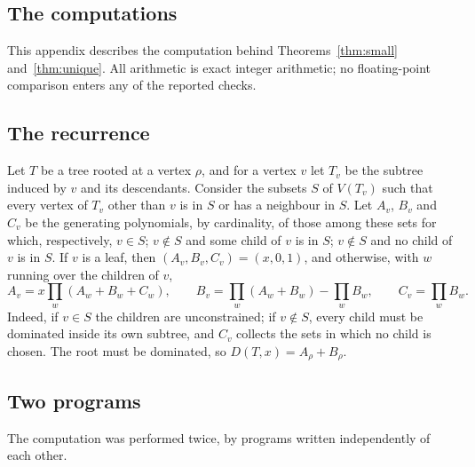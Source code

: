 \documentclass[smallextended,envcountsect,envcountsame]{svjour3}
\begin{document}
\begin{appendices}
\section{The computations}\label{app:computation}

This appendix describes the computation behind Theorems~\ref{thm:small}
and~\ref{thm:unique}. All
arithmetic is exact integer arithmetic; no floating-point comparison enters
any of the reported checks.

\subsection*{The recurrence}
Let $T$ be a tree rooted at a vertex $\rho$, and for a vertex $v$ let $T_v$
be the subtree induced by $v$ and its descendants. Consider the subsets $S$
of $V(T_v)$ such that every vertex of $T_v$ other than $v$ is in $S$ or has a
neighbour in $S$. Let $A_v$, $B_v$ and $C_v$ be the generating polynomials, by
cardinality, of those among these sets for which, respectively, $v\in S$;
$v\notin S$ and some child of $v$ is in $S$; $v\notin S$ and no child of $v$
is in $S$. If $v$ is a leaf, then $(A_v,B_v,C_v)=(x,0,1)$, and otherwise,
with $w$ running over the children of $v$,
\begingroup\small\begin{equation}\label{eq:dp}
  A_v=x\prod_w(A_w+B_w+C_w),\qquad
  B_v=\prod_w(A_w+B_w)-\prod_w B_w,\qquad
  C_v=\prod_w B_w .
\end{equation}\endgroup
Indeed, if $v\in S$ the children are unconstrained; if $v\notin S$, every
child must be dominated inside its own subtree, and $C_v$ collects the sets in
which no child is chosen. The root must be dominated, so
$D(T,x)=A_\rho+B_\rho$.

\subsection*{Two programs}
The computation was performed twice, by programs written independently of
each other.


\end{appendices}
\end{document}
